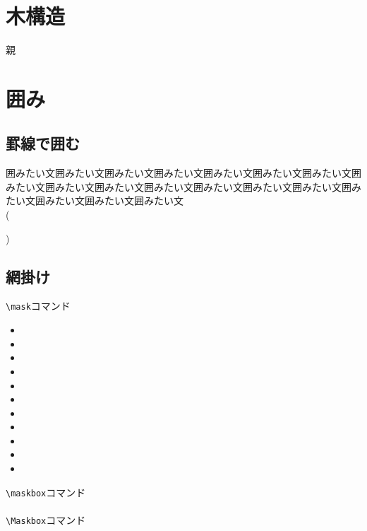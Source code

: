 \documentclass{jsarticle}					%
\begin{document}
\section{木構造}
	\begin{classify}{親}		%
	\end{classify}

\section{囲み}

\subsection{罫線で囲む}
	\begin{breakbox}
		囲みたい文囲みたい文囲みたい文囲みたい文囲みたい文囲みたい文囲みたい文囲みたい文囲みたい文囲みたい文囲みたい文囲みたい文囲みたい文囲みたい文囲みたい文囲みたい文囲みたい文囲みたい文\\
		(\parbox[c]{7.5zw}{})
	\end{breakbox}

\subsection{網掛け}
	\verb|\mask|コマンド
	\begin{itemize}
		\item {}
		\item {}
		\item {}
		\item {}
		\item {}
		\item {}
		\item {}
		\item {}
		\item {}
		\item {}
		\item {}
	\end{itemize}
	\verb|\maskbox|コマンド\\
	\\
	\verb|\Maskbox|コマンド\\
	\\
	
\end{document}
